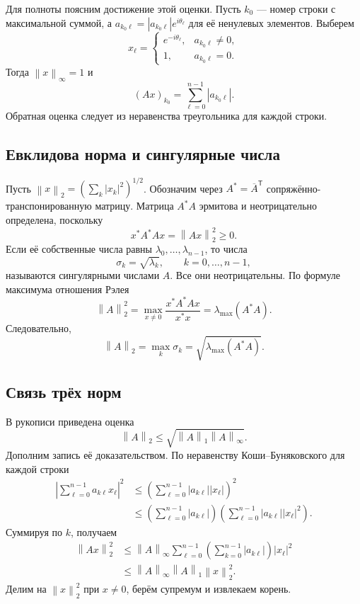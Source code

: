 \documentclass[12pt,a4paper]{article}
\theoremstyle{definition}
\theoremstyle{remark}
\newcommand{\norm}[1]{\left\lVert #1\right\rVert}
\begin{document}
Для полноты поясним достижение этой оценки. Пусть $k_0$ --- номер строки
с максимальной суммой, а $a_{k_0\ell}=|a_{k_0\ell}|e^{i\theta_\ell}$
для её ненулевых элементов. Выберем
\[
  x_\ell=\begin{cases}
    e^{-i\theta_\ell},&a_{k_0\ell}\ne0,\\
    1,&a_{k_0\ell}=0.
  \end{cases}
\]
Тогда $\norm{x}_\infty=1$ и
\[
  (Ax)_{k_0}=\sum_{\ell=0}^{n-1}|a_{k_0\ell}|.
\]
Обратная оценка следует из неравенства треугольника для каждой строки.

\subsection{Евклидова норма и сингулярные числа}

Пусть $\norm{x}_2=(\sum_k|x_k|^2)^{1/2}$. Обозначим через
$A^*=\overline{A}^{\mathsf T}$ сопряжённо-транспонированную матрицу.
Матрица $A^*A$ эрмитова и неотрицательно определена, поскольку
\[
  x^*A^*Ax=\norm{Ax}_2^2\geqslant0.
\]
Если её собственные числа равны $\lambda_0,\dots,\lambda_{n-1}$, то числа
\[
  \sigma_k=\sqrt{\lambda_k},\qquad k=0,\dots,n-1,
\]
называются сингулярными числами $A$. Все они неотрицательны.
По формуле максимума отношения Рэлея
\[
  \norm{A}_2^2
  =\max_{x\ne0}\frac{x^*A^*Ax}{x^*x}
  =\lambda_{\max}(A^*A).
\]
Следовательно,
\[
  \boxed{\norm{A}_2=\max_k\sigma_k
    =\sqrt{\lambda_{\max}(A^*A)}}.
\]

\subsection{Связь трёх норм}

В рукописи приведена оценка
\[
  \boxed{\norm{A}_2\leqslant
    \sqrt{\norm{A}_1\norm{A}_\infty}}.
\]
Дополним запись её доказательством. По неравенству Коши--Буняковского
для каждой строки
\begin{align*}
  \left|\sum_{\ell=0}^{n-1}a_{k\ell}x_\ell\right|^2
  &\leqslant\left(\sum_{\ell=0}^{n-1}|a_{k\ell}||x_\ell|\right)^2\\
  &\leqslant\left(\sum_{\ell=0}^{n-1}|a_{k\ell}|\right)
    \left(\sum_{\ell=0}^{n-1}|a_{k\ell}||x_\ell|^2\right).
\end{align*}
Суммируя по $k$, получаем
\begin{align*}
  \norm{Ax}_2^2
  &\leqslant\norm{A}_\infty
    \sum_{\ell=0}^{n-1}\left(\sum_{k=0}^{n-1}|a_{k\ell}|\right)|x_\ell|^2\\
  &\leqslant\norm{A}_\infty\norm{A}_1\norm{x}_2^2.
\end{align*}
Делим на $\norm{x}_2^2$ при $x\ne0$, берём супремум и извлекаем корень.
\end{document}
